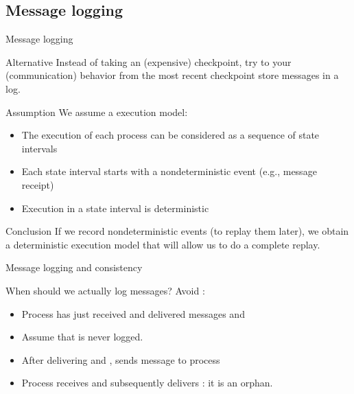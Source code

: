 \subsection{Message logging}
\begin{slide}{Message logging}
  \begin{alertblock}{Alternative} 
    Instead of taking an (expensive) checkpoint, try to  your (communication) behavior from the
    most recent checkpoint \mathexpr{\Rightarrow} store messages in a log.
  \end{alertblock}
  \begin{block}{Assumption}
    We assume a  execution model:
    \begin{itemize}\tightlist
    \item The execution of each process can be considered as a sequence of state intervals
    \item Each state interval starts with a nondeterministic event (e.g., message receipt)
    \item Execution in a state interval is deterministic
    \end{itemize}
  \end{block}
  \begin{alertblock}{Conclusion} 
    If we record nondeterministic events (to replay them later), we obtain a deterministic execution model
    that will allow us to do a complete replay.
  \end{alertblock}
\end{slide}
\begin{slide}{Message logging and consistency}
  \begin{block}{When should we actually log messages?}
    Avoid :
    \begin{itemize}\tightlist
    \item Process  has just received and delivered messages  and 
    \item Assume that  is never logged.
    \item After delivering  and ,  sends message  to process 
    \item Process  receives and subsequently delivers : it is an orphan.
    \end{itemize}
  \end{block}
  \begin{centerfig}
  \end{centerfig}
\end{slide}
